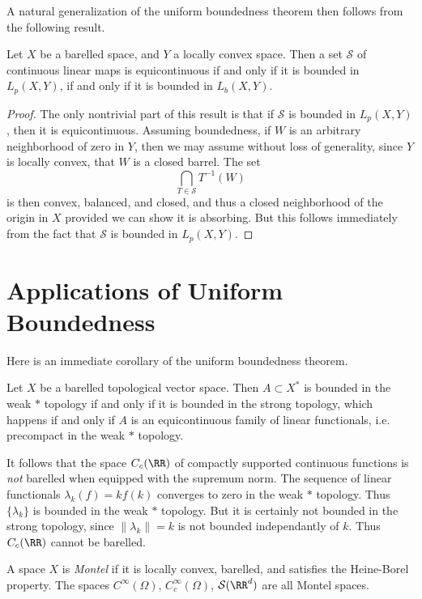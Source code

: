 A natural generalization of the uniform boundedness theorem then follows from the following result.

\begin{theorem}
    Let $X$ be a barelled space, and $Y$ a locally convex space. Then a set $\mathcal{S}$ of continuous linear maps is equicontinuous if and only if it is bounded in $L_p(X,Y)$, if and only if it is bounded in $L_b(X,Y)$.
\end{theorem}
\begin{proof}
    The only nontrivial part of this result is that if $\mathcal{S}$ is bounded in $L_p(X,Y)$, then it is equicontinuous. Assuming boundedness, if $W$ is an arbitrary neighborhood of zero in $Y$, then we may assume without loss of generality, since $Y$ is locally convex, that $W$ is a closed barrel. The set
    \[ \bigcap_{T \in \mathcal{S}} T^{-1}(W) \]
    is then convex, balanced, and closed, and thus a closed neighborhood of the origin in $X$ provided we can show it is absorbing. But this follows immediately from the fact that $\mathcal{S}$ is bounded in $L_p(X,Y)$.
\end{proof}

\section{Applications of Uniform Boundedness}

Here is an immediate corollary of the uniform boundedness theorem.

\begin{theorem}
    Let $X$ be a barelled topological vector space. Then $A \subset X^*$ is bounded in the weak $*$ topology if and only if it is bounded in the strong topology, which happens if and only if $A$ is an equicontinuous family of linear functionals, i.e. precompact in the weak $*$ topology.
\end{theorem}

It follows that the space $C_c(\RR)$ of compactly supported continuous functions is \emph{not} barelled when equipped with the supremum norm. The sequence of linear functionals $\lambda_k(f) = k f(k)$ converges to zero in the weak $*$ topology. Thus $\{ \lambda_k \}$ is bounded in the weak $*$ topology. But it is certainly not bounded in the strong topology, since $\| \lambda_k \| = k$ is not bounded independantly of $k$. Thus $C_c(\RR)$ cannot be barelled.

A space $X$ is \emph{Montel} if it is locally convex, barelled, and satisfies the Heine-Borel property. The spaces $C^\infty(\Omega)$, $C_c^\infty(\Omega)$, $\mathcal{S}(\RR^d)$ are all Montel spaces.


